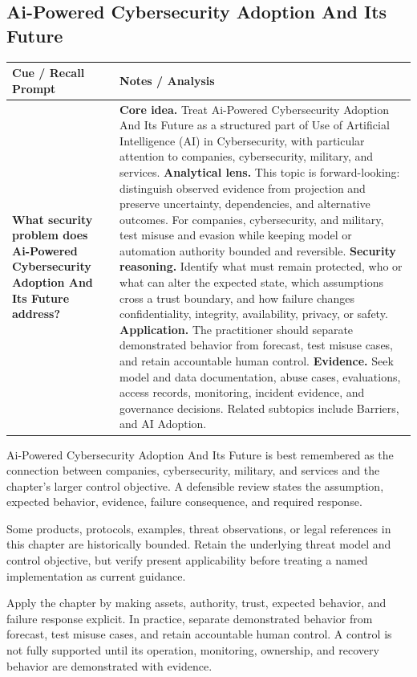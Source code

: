 \documentclass[11pt]{article}
\newcommand{\CornellHeader}{%
\rowcolor{Navy}\color{white}\bfseries Cue / Recall Prompt & \color{white}\bfseries Notes / Analysis\\\hline}
\newcommand{\CornellRow}[2]{%
\cellcolor{CueGray}\RaggedRight\textbf{#1} & \RaggedRight #2\\\hline}
\begin{document}
\subsection*{Ai-Powered Cybersecurity Adoption And Its Future}
\begin{longtable}{>{\RaggedRight\arraybackslash}p{}|>{\RaggedRight\arraybackslash}p{}}
\CornellHeader
\CornellRow{What security problem does Ai-Powered Cybersecurity Adoption And Its Future address?}{\textbf{Core idea.} Treat Ai-Powered Cybersecurity Adoption And Its Future as a structured part of Use of Artificial Intelligence (AI) in Cybersecurity, with particular attention to companies, cybersecurity, military, and services. \textbf{Analytical lens.} This topic is forward-looking: distinguish observed evidence from projection and preserve uncertainty, dependencies, and alternative outcomes. For companies, cybersecurity, and military, test misuse and evasion while keeping model or automation authority bounded and reversible. \textbf{Security reasoning.} Identify what must remain protected, who or what can alter the expected state, which assumptions cross a trust boundary, and how failure changes confidentiality, integrity, availability, privacy, or safety. \textbf{Application.} The practitioner should separate demonstrated behavior from forecast, test misuse cases, and retain accountable human control. \textbf{Evidence.} Seek model and data documentation, abuse cases, evaluations, access records, monitoring, incident evidence, and governance decisions. Related subtopics include Barriers, and AI Adoption.}
\end{longtable}
\begin{topicsummary}
Ai-Powered Cybersecurity Adoption And Its Future is best remembered as the connection between companies, cybersecurity, military, and services and the chapter's larger control objective. A defensible review states the assumption, expected behavior, evidence, failure consequence, and required response.
\end{topicsummary}
\begin{historybox}
Some products, protocols, examples, threat observations, or legal references in this chapter are historically bounded. Retain the underlying threat model and control objective, but verify present applicability before treating a named implementation as current guidance.
\end{historybox}
\begin{defensebox}
Apply the chapter by making assets, authority, trust, expected behavior, and failure response explicit. In practice, separate demonstrated behavior from forecast, test misuse cases, and retain accountable human control. A control is not fully supported until its operation, monitoring, ownership, and recovery behavior are demonstrated with evidence.
\end{defensebox}
\end{document}
